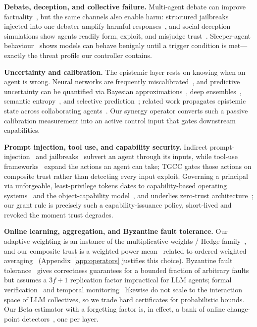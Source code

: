 \documentclass[sigconf,anonymous]{acmart}
\theoremstyle{plain}
\theoremstyle{definition}
\theoremstyle{remark}
\begin{document}
\textbf{Debate, deception, and collective failure.}
Multi-agent debate can improve factuality~\cite{du2023debate,liang2023encouraging}, but
the same channels also enable harm: structured jailbreaks injected into one debater
amplify harmful responses~\cite{qi2025amplified}, and social deception simulations show
agents readily form, exploit, and misjudge trust~\cite{traitors2025}. Sleeper-agent
behaviour~\cite{hubinger2024sleeper} shows models can behave benignly until a trigger
condition is met---exactly the threat profile our controller contains.

\textbf{Uncertainty and calibration.}
The epistemic layer rests on knowing when an agent is wrong. Neural networks are
frequently miscalibrated~\cite{guo2017calibration}, and predictive uncertainty can be
quantified via Bayesian approximations~\cite{gal2016dropout}, deep
ensembles~\cite{lakshminarayanan2017simple}, semantic
entropy~\cite{kuhn2023semantic}, and selective prediction~\cite{geifman2017selective};
related work propagates epistemic state across collaborating agents~\cite{epistemic2026}.
Our synergy operator converts such a passive calibration measurement into an active
control input that gates downstream capabilities.

\textbf{Prompt injection, tool use, and capability security.}
Indirect prompt-injection~\cite{greshake2023not} and jailbreaks~\cite{wei2023jailbroken}
subvert an agent through its inputs, while tool-use
frameworks~\cite{schick2023toolformer,yao2023react} expand the actions an agent can take;
TGCC gates those actions on composite trust rather than detecting every input exploit.
Governing a principal via unforgeable, least-privilege tokens dates to capability-based
operating systems~\cite{dennis1966programming} and the object-capability
model~\cite{miller2006robust}, and underlies zero-trust
architecture~\cite{nist800207}; our grant rule is precisely such a capability-issuance
policy, short-lived and revoked the moment trust degrades.

\textbf{Online learning, aggregation, and Byzantine fault tolerance.}
Our adaptive weighting is an instance of the multiplicative-weights / Hedge
family~\cite{freund1997decision,arora2012mw,cesabianchi2006prediction}, and our composite
trust is a weighted power mean~\cite{hardy1952inequalities} related to ordered weighted
averaging~\cite{yager1988ordered} (Appendix~\ref{app:operators} justifies this choice).
Byzantine fault tolerance~\cite{lamport1982byzantine,castro1999practical} gives
correctness guarantees for a bounded fraction of arbitrary faults but assumes a $3f+1$
replication factor impractical for LLM agents; formal
verification~\cite{katz2017reluplex,gehr2018ai2} and temporal
monitoring~\cite{koymans1990specifying} likewise do not scale to the interaction space of
LLM collectives, so we trade hard certificates for probabilistic bounds. Our Beta
estimator with a forgetting factor is, in effect, a bank of online change-point
detectors~\cite{page1954continuous,basseville1993detection}, one per layer.
\end{document}
